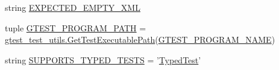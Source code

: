 \begin{DoxyCompactItemize}
\item 
string \hyperlink{namespacegtest__xml__output__unittest_abe1569d019b037f006986004349c7cf3}{E\-X\-P\-E\-C\-T\-E\-D\-\_\-\-E\-M\-P\-T\-Y\-\_\-\-X\-M\-L}
\item 
tuple \hyperlink{namespacegtest__xml__output__unittest_a775ae6280a8c718f2cb0e0a9bad07f2b}{G\-T\-E\-S\-T\-\_\-\-P\-R\-O\-G\-R\-A\-M\-\_\-\-P\-A\-T\-H} = \hyperlink{namespacegtest__test__utils_a1bdf3cac86afa675ed37629b183048e9}{gtest\-\_\-test\-\_\-utils.\-Get\-Test\-Executable\-Path}(\hyperlink{namespacegtest__xml__output__unittest_ab89cc5b402310ef67bcaf38fa5017461}{G\-T\-E\-S\-T\-\_\-\-P\-R\-O\-G\-R\-A\-M\-\_\-\-N\-A\-M\-E})
\item 
string \hyperlink{namespacegtest__xml__output__unittest_a07eecd027d660022c0ab447f3c3e0f2e}{S\-U\-P\-P\-O\-R\-T\-S\-\_\-\-T\-Y\-P\-E\-D\-\_\-\-T\-E\-S\-T\-S} = '\hyperlink{class_typed_test}{Typed\-Test}'
\end{DoxyCompactItemize}



